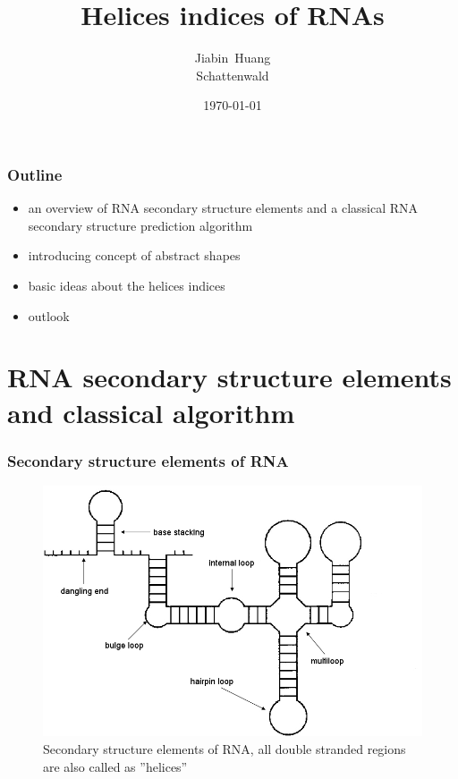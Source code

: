 \documentclass[ignorenonframetext,10pt]{beamer}
\title{Helices indices of RNAs}
\author{\large Jiabin~Huang\\
               Schattenwald}
\date{\today}
\institute[ExpBI]{\normalsize
Genetics \& Experimental Bioinformatics\\
University Freiburg\\
Institute of Biology III}
\begin{document}
\frame{\maketitle}

\begin{frame}
\frametitle{Outline}
   \begin{itemize}
   \item an overview of RNA secondary structure elements and a classical RNA secondary structure prediction algorithm
   \item introducing concept of abstract shapes  
   \item basic ideas about the helices indices
   \item outlook            
   \end{itemize}
\end{frame}


\section{RNA secondary structure elements and classical algorithm}
\begin{frame}
\frametitle{Secondary structure elements of RNA}  
\begin{figure}
  \includegraphics[scale=0.35]{images/RNA_components.jpg} 
  \caption{Secondary structure elements of RNA, all double stranded regions are also called as ''helices''}
\end{figure}
\end{frame}
\end{document}
